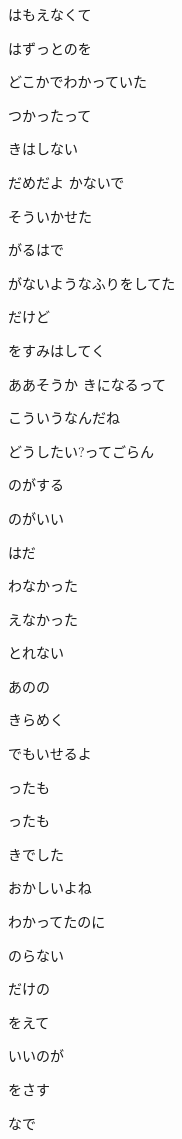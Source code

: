 \documentclass[14pt]{ltjsarticle}
\begin{document}
{  はもえなくて
  \jisho{}

\item
  はずっとのを
  \jisho{}

  どこかでわかっていた
  \jisho{}

  つかったって
  \jisho{}

  きはしない
  \jisho{}

  だめだよ かないで
  \jisho{}

  そういかせた
  \jisho{}

\item
  がるはで
  \jisho{}

  がないようなふりをしてた
  \jisho{}

  だけど
  \jisho{}

  をすみはしてく
  \jisho{}

  ああそうか きになるって
  \jisho{}

  こういうなんだね
  \jisho{}

\item
  どうしたい?ってごらん
  \jisho{}

  のがする
  \jisho{}

  のがいい
  \jisho{}

  はだ
  \jisho{}

\item
  わなかった
  \jisho{}

  えなかった
  \jisho{}

  とれない
  \jisho{}

\item
  あのの
  \jisho{}

  きらめく
  \jisho{}

  でもいせるよ
  \jisho{}

  ったも
  \jisho{}

  ったも
  \jisho{}

  きでした
  \jisho{}

  おかしいよね
  \jisho{}

  わかってたのに
  \jisho{}

  のらない
  \jisho{}

  だけの
  \jisho{}

  をえて
  \jisho{}

  いいのが
  \jisho{}

  をさす
  \jisho{}

  なで
  \jisho{}

  
}
\end{document}
